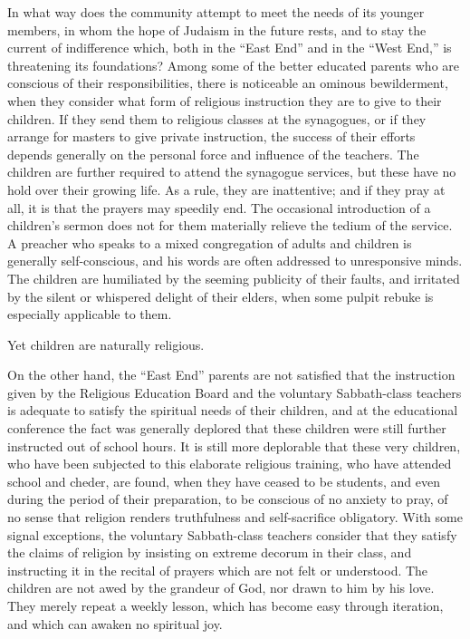 In what way does the community attempt to meet the 
needs of its younger members, in whom the hope of 
Judaism in the future rests, and to stay the current of 
indifference which, both in the ``East End'' and in the 
``West End,'' is threatening its foundations? Among some 
of the better educated parents who are conscious of their responsibilities, there is noticeable an ominous bewilderment, 
when they consider what form of religious instruction they 
are to give to their children. If they send them to religious 
classes at the synagogues, or if they arrange for masters to 
give private instruction, the success of their efforts depends 
generally on the personal force and influence of the teachers. 
The children are further required to attend the synagogue 
services, but these have no hold over their growing life. 
As a rule, they are inattentive; and if they pray at 
all, it is that the prayers may speedily end. The 
occasional introduction of a children's sermon does not 
for them materially relieve the tedium of the service. 
A preacher who speaks to a mixed congregation of adults 
and children is generally self-conscious, and his words are 
often addressed to unresponsive minds. The children are 
humiliated by the seeming publicity of their faults, and 
irritated by the silent or whispered delight of their elders, 
when some pulpit rebuke is especially applicable to them. 

Yet children are naturally religious. 

On the other hand, the ``East End'' parents are not 
satisfied that the instruction given by the Religious Education Board and the voluntary Sabbath-class teachers is 
adequate to satisfy the spiritual needs of their children, 
and at the educational conference the fact was generally 
deplored that these children were still further instructed 
out of school hours. It is still more deplorable that these 
very children, who have been subjected to this elaborate 
religious training, who have attended school and cheder, 
are found, when they have ceased to be students, and even 
during the period of their preparation, to be conscious 
of no anxiety to pray, of no sense that religion renders 
truthfulness and self-sacrifice obligatory. With some 
signal exceptions, the voluntary Sabbath-class teachers 
consider that they satisfy the claims of religion by insisting 
on extreme decorum in their class, and instructing it in the 
recital of prayers which are not felt or understood. The 
children are not awed by the grandeur of God, nor drawn 
to him by his love. They merely repeat a weekly lesson, 
which has become easy through iteration, and which can 
awaken no spiritual joy. 

